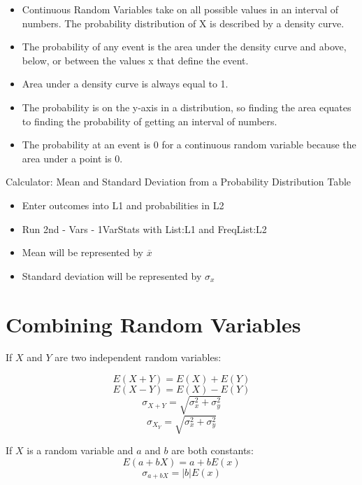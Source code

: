 \documentclass[../stats.tex]{subfiles}
\begin{document}
\begin{itemize}
    \item Continuous Random Variables take on all possible values in an interval of numbers. The probability distribution of X is described by a density curve.
    \item The probability of any event is the area under the density curve and above, below, or between the values x that define the event.
    \item Area under a density curve is always equal to 1.
    \item The probability is on the y-axis in a distribution, so finding the area equates to finding the probability of getting an interval of numbers.
    \item The probability at an event is 0 for a continuous random variable because the area under a point is 0.
\end{itemize}

Calculator: Mean and Standard Deviation from a Probability Distribution Table 
\begin{itemize}
    \item Enter outcomes into L1 and probabilities in L2 
    \item Run 2nd - Vars - 1VarStats with List:L1 and FreqList:L2 
    \item Mean will be represented by $\overline{x}$
    \item Standard deviation will be represented by $\sigma_x$
\end{itemize}

\section{Combining Random Variables}
If $X$ and $Y$ are two independent random variables:

\[E(X+Y)=E(X)+E(Y)\]
\[E(X-Y)=E(X)-E(Y)\]
\[\sigma_{X+Y}=\sqrt{\sigma_x^2 + \sigma_y^2}\]
\[\sigma_{X_Y}=\sqrt{\sigma_x^2 + \sigma_y^2}\]

If $X$ is a random variable and $a$ and $b$ are both constants:
\[E(a+bX)=a+bE(x)\]
\[\sigma_{a+bX}=|b|E(x)\]
\end{document}
